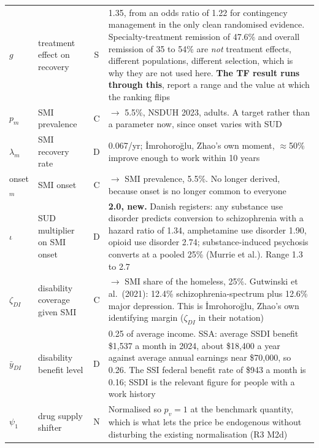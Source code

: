 \documentclass[11pt]{article}
\begin{document}
\begin{longtable}{lL{3.8cm}cL{5.8cm}}
$g$ & treatment effect on recovery & S & 1.35, from an odds ratio of 1.22 for contingency management in the only clean randomised evidence. Specialty-treatment remission of 47.6\% and overall remission of 35 to 54\% are \emph{not} treatment effects, different populations, different selection, which is why they are not used here. \textbf{The TF result runs through this}, report a range and the value at which the ranking flips\\
$p_m$ & SMI prevalence & C & $\rightarrow$ 5.5\%, NSDUH 2023, adults. A target rather than a parameter now, since onset varies with SUD\\
$\lambda_m$ & SMI recovery rate & D & 0.067/yr; \.{I}mrohoro\u{g}lu, Zhao's own moment, $\approx$50\% improve enough to work within 10 years\\
onset$_m$ & SMI onset & C & $\rightarrow$ SMI prevalence, 5.5\%. No longer derived, because onset is no longer common to everyone\\
$\iota$ & SUD multiplier on SMI onset & D & \textbf{2.0, new.} Danish registers: any substance use disorder predicts conversion to schizophrenia with a hazard ratio of 1.34, amphetamine use disorder 1.90, opioid use disorder 2.74; substance-induced psychosis converts at a pooled 25\% (Murrie et al.). Range 1.3 to 2.7\\
$\zeta_{DI}$ & disability coverage given SMI & C & $\rightarrow$ SMI share of the homeless, 25\%. Gutwinski et al.\ (2021): 12.4\% schizophrenia-spectrum plus 12.6\% major depression. This is \.{I}mrohoro\u{g}lu, Zhao's own identifying margin ($\zeta_{DI}$ in their notation)\\
$\bar y_{DI}$ & disability benefit level & D & 0.25 of average income. SSA: average SSDI benefit \$1,537 a month in 2024, about \$18,400 a year against average annual earnings near \$70,000, so 0.26. The SSI federal benefit rate of \$943 a month is 0.16; SSDI is the relevant figure for people with a work history\\
$\psi_1$ & drug supply shifter & N & Normalised so $p_v=1$ at the benchmark quantity, which is what lets the price be endogenous without disturbing the existing normalisation (R3 M2d)\\

\end{longtable}
\end{document}
